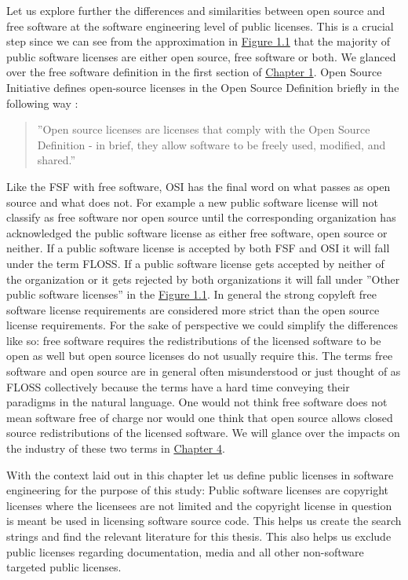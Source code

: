 Let us explore further the differences and similarities between open source and free software at the software engineering level of public licenses. This is a crucial step since we can see from the approximation in \hyperref[fig:terms]{Figure 1.1} that the majority of public software licenses are either open source, free software or both. We glanced over the free software definition in the first section of \hyperref[intro]{Chapter 1}. Open Source Initiative defines open-source licenses in the Open Source Definition briefly in the following way \citep{osi:licenselist}:
\begin{quote}
	''Open source licenses are licenses that comply with the Open Source Definition - in brief, they allow software to be freely used, modified, and shared.''
\end{quote}
Like the FSF with free software, OSI has the final word on what passes as open source and what does not. For example a new public software license will not classify as free software nor open source until the corresponding organization has acknowledged the public software license as either free software, open source or neither. If a public software license is accepted by both FSF and OSI it will fall under the term FLOSS. If a public software license gets accepted by neither of the organization or it gets rejected by both organizations it will fall under ''Other public software licenses'' in the \hyperref[fig:terms]{Figure 1.1}. In general the strong copyleft free software license requirements are considered more strict than the open source license requirements. For the sake of perspective we could simplify the differences like so: free software requires the redistributions of the licensed software to be open as well but open source licenses do not usually require this. The terms free software and open source are in general often misunderstood or just thought of as FLOSS collectively because the terms have a hard time conveying their paradigms in the natural language. One would not think free software does not mean software free of charge nor would one think that open source allows closed source redistributions of the licensed software. We will glance over the impacts on the industry of these two terms in \hyperref[discussion]{Chapter 4}.

With the context laid out in this chapter let us define public licenses in software engineering for the purpose of this study: Public software licenses are copyright licenses where the licensees are not limited and the copyright license in question is meant be used in licensing software source code. This helps us create the search strings and find the relevant literature for this thesis. This also helps us exclude public licenses regarding documentation, media and all other non-software targeted public licenses.

